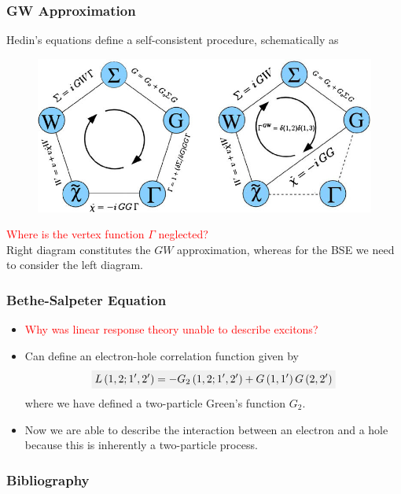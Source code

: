 \documentclass{beamer}
\newcommand{\highlight}[1]{\colorbox{caltechgray!10}{$\displaystyle#1$}}
\begin{document}
\begin{frame}
    \frametitle{\textcolor{caltechorange}{GW Approximation}}
    Hedin's equations\autocite{hedin_new_1965} define a self-consistent procedure, schematically\autocite{noauthor_frontiers_nodate} as
    \begin{figure}
        \centering
        \includegraphics[width=\textwidth]{Left-panel-Graphical-representation-of-Hedins-equations-Right-panel-The-four-coupled.jpg}
        \label{fig:hedin}
    \end{figure}
    \pause
    \textcolor{red}{Where is the vertex function $\Gamma$ neglected?}\\
    \pause
    Right diagram constitutes the $GW$ approximation, whereas for the BSE we need to consider the left diagram.
\end{frame}

\begin{frame}
    \frametitle{\textcolor{caltechorange}{Bethe-Salpeter Equation}}
    \begin{itemize}
        \item \textcolor{red}{Why was linear response theory unable to describe excitons?}
        \pause
        \item Can define an electron-hole correlation function given by
        \begin{equation}
        \highlight{L\left(1,2 ; 1^{\prime}, 2^{\prime}\right)=-G_2\left(1,2 ; 1^{\prime}, 2^{\prime}\right)+G\left(1,1^{\prime}\right) G\left(2,2^{\prime}\right)}
        \end{equation}
        where we have defined a two-particle Green's function $G_2$.
        \pause
        \item Now we are able to describe the interaction between an electron and a hole because this is inherently a two-particle process.
    \end{itemize}
\end{frame}

\begin{frame}
    \frametitle{\textcolor{caltechorange}{Bibliography}}
    \printbibliography
\end{frame}
\end{document}
